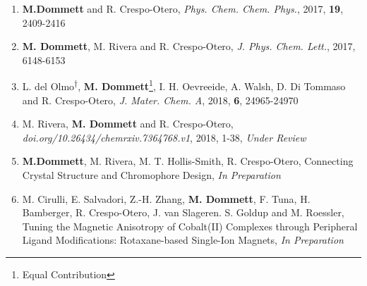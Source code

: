 \begin{enumerate}
    \item \textbf{M.Dommett} and R. Crespo-Otero, \textit{Phys. Chem. Chem. Phys.}, 2017, \textbf{19}, 2409-2416
    \item \textbf{M. Dommett}, M. Rivera and R. Crespo-Otero, \textit{J. Phys. Chem. Lett.}, 2017, 6148-6153
    \item L. del Olmo\textsuperscript{$\dag$}, \textbf{M. Dommett}\footnote[2]{Equal Contribution}, I. H. Oevreeide, A. Walsh, D. Di Tommaso and R. Crespo-Otero, \textit{J. Mater. Chem. A}, 2018, \textbf{6}, 24965-24970
     \item M. Rivera, \textbf{M. Dommett}  and R. Crespo-Otero, \textit{doi.org/10.26434/chemrxiv.7364768.v1}, 2018, 1-38, \textit{Under Review}
     
    \item \textbf{M.Dommett}, M. Rivera, M. T. Hollis-Smith, R. Crespo-Otero, Connecting Crystal Structure and Chromophore Design, \textit{In Preparation}
    
    \item M. Cirulli, E. Salvadori, Z.-H. Zhang, \textbf{M. Dommett}, F. Tuna, H. Bamberger, R. Crespo-Otero, J. van Slageren. S. Goldup and M. Roessler, Tuning the Magnetic Anisotropy of Cobalt(II) Complexes through Peripheral Ligand Modifications: Rotaxane-based Single-Ion Magnets, \textit{In Preparation}

\end{enumerate}